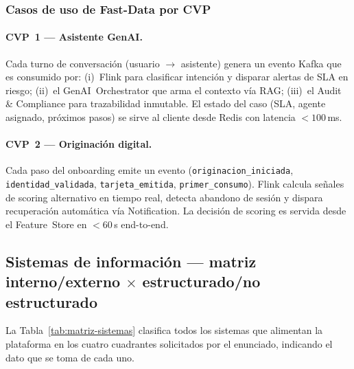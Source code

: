 \documentclass[11pt,letterpaper]{article}
\begin{document}
\subsubsection{Casos de uso de Fast-Data por CVP}

\paragraph{CVP~1 — Asistente GenAI.} Cada turno de conversación
(usuario $\to$ asistente) genera un evento Kafka que es consumido por:
(i)~Flink para clasificar intención y disparar alertas de SLA en riesgo;
(ii)~el GenAI~Orchestrator que arma el contexto vía RAG; (iii)~el Audit
\& Compliance para trazabilidad inmutable. El estado del caso (SLA,
agente asignado, próximos pasos) se sirve al cliente desde Redis con
latencia $<100$\,ms.

\paragraph{CVP~2 — Originación digital.} Cada paso del onboarding emite
un evento (\texttt{originacion\_iniciada}, \texttt{identidad\_validada},
\texttt{tarjeta\_emitida}, \texttt{primer\_consumo}). Flink calcula
señales de scoring alternativo en tiempo real, detecta abandono de
sesión y dispara recuperación automática vía Notification. La decisión
de scoring es servida desde el Feature~Store en $<60$\,s end-to-end.

\subsection{Sistemas de información — matriz interno/externo $\times$
estructurado/no estructurado}
\label{sec:sistemas}

La Tabla~\ref{tab:matriz-sistemas} clasifica todos los sistemas que
alimentan la plataforma en los cuatro cuadrantes solicitados por el
enunciado, indicando el dato que se toma de cada uno.
\end{document}
